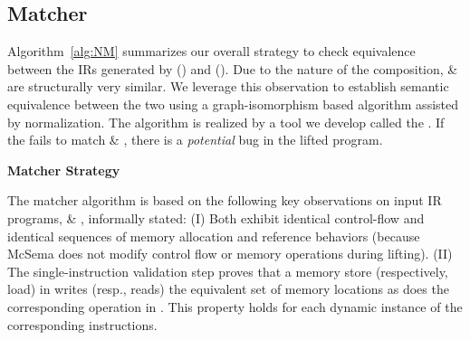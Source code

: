 \subsection{Matcher}\label{sec:matcher}
Algorithm~\ref{alg:NM} summarizes our overall strategy to check equivalence 
between the IRs generated by \mcsema (\T) and \compd (\TP). Due to the nature 
of the composition, \T \& \TP are structurally very similar. 
We leverage this observation to establish 
semantic equivalence between the two using a graph-isomorphism based 
algorithm assisted by 
normalization.  The algorithm is realized by a tool 
we develop called the \matcher. If the   
\matcher fails to match \T \& \TP, there is a \emph{potential} bug in the lifted program. 
\newcommand\mycommfont[1]{\footnotesize\textcolor{blue}{#1}}
\begin{algorithm}
    
    
    \BlankLine
    
    \caption{\textbf{Matcher Strategy}}\label{alg:NM}
\end{algorithm}

The matcher algorithm is based on the following key observations on input IR 
programs,  \& \Tp, informally stated:
%
(I) Both exhibit identical control-flow and identical sequences of memory allocation
and reference behaviors (because McSema does not modify control flow or memory operations
during lifting).
%
(II) The single-instruction validation step proves that a memory store 
(respectively, load) in  writes (resp., reads) the equivalent set of memory
locations as does the corresponding operation in \Tp.  This property holds for
each dynamic instance of the corresponding instructions.

